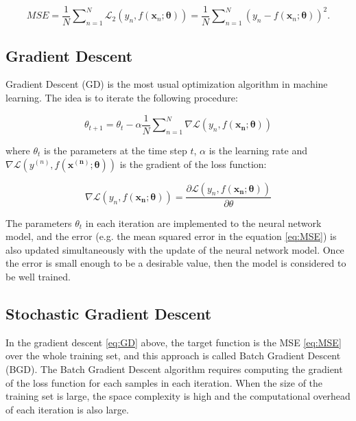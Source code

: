 \documentclass[
	parskip, 			   %
	twoside, 			   %
	DIV=14, 			   %
	BCOR=15.0mm, 		   %
	headsepline, 		   %
	open=right, 		   %
	captions=tableheading, %
	bibliography=totoc,    %
	numbers=noenddot       %
]{scrreprt}
\begin{document}
\begin{equation}
    \label{eq:MSE}
    MSE = \frac{1}{N} \sum\nolimits_{n=1}^N \mathcal{L}_{2}\left( y_n,f(\mathbf{x}_n;\mathbf{\theta}) \right) = \frac{1}{N} \sum\nolimits_{n=1}^N (y_n-f(\mathbf{x}_n;\mathbf{\theta}))^2.
\end{equation}


\subsection{Gradient Descent}
Gradient Descent (GD) is the most usual optimization algorithm in machine learning. The idea is to iterate the following procedure:

\begin{equation}
    \label{eq:GD}
    \theta_{t+1} = \theta_{t} - \alpha \frac{1}{N} \sum\nolimits_{n=1}^N \nabla \mathcal{L}\left( y_{n},f(\mathbf{x_{n}};\mathbf{\theta}) \right)
\end{equation}

where $\theta_{t}$ is the parameters at the time step $t$, $\alpha$ is the learning rate and $\nabla \mathcal{L}\left( y^{(n)},f(\mathbf{x^{(n)}};\mathbf{\theta}) \right)$ is the gradient of the loss function:

\begin{equation}
    \label{eq:Gradient_loss}
    \nabla \mathcal{L}\left( y_{n},f(\mathbf{x_{n}};\mathbf{\theta}) \right) = \frac{\partial \mathcal{L}\left( y_{n},f(\mathbf{x_{n}};\mathbf{\theta}) \right)}{\partial \theta}
\end{equation}

The parameters $\theta_{t}$ in each iteration are implemented to the neural network model, and the error (e.g. the mean squared error in the equation \ref{eq:MSE}) is also updated simultaneously with the update of the neural network model. Once the error is small enough to be a desirable value, then the model is considered to be well trained.

\subsection{Stochastic Gradient Descent}
In the gradient descent \ref{eq:GD} above, the target function is the MSE \ref{eq:MSE} over the whole training set, and this approach is called Batch Gradient Descent (BGD).  The Batch Gradient Descent algorithm requires computing the gradient of the loss function for each samples in each iteration. When the size of the training set is large, the space complexity is high and the computational overhead of each iteration is also large.
\end{document}
